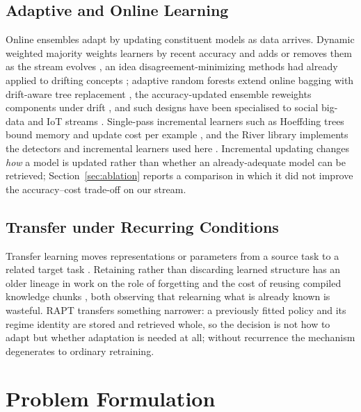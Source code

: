 \documentclass[conference]{IEEEtran}
\begin{document}
\subsection{Adaptive and Online Learning}
Online ensembles adapt by updating constituent models as data arrives. Dynamic
weighted majority weights learners by recent accuracy and adds or removes them as the
stream evolves \cite{JMLR:v8:kolter07a}, an idea disagreement-minimizing methods had
already applied to drifting concepts \cite{helmbold1994tracking}; adaptive random
forests extend online bagging with drift-aware tree replacement \cite{gomes2017adaptive},
the accuracy-updated ensemble reweights components under drift \cite{brzezinski2013reacting},
and such designs have been specialised to social big-data and IoT streams
\cite{abbasi2021elstream,yang2021pwpae}. Single-pass incremental learners such as
Hoeffding trees bound memory and update cost per example \cite{domingos2000mining},
and the River library implements the detectors and incremental learners used here
\cite{montiel2021river}. Incremental updating changes \emph{how} a model is updated
rather than whether an already-adequate model can be retrieved;
Section~\ref{sec:ablation} reports a comparison in which it did not improve the
accuracy--cost trade-off on our stream.

\subsection{Transfer under Recurring Conditions}
Transfer learning moves representations or parameters from a source task to a
related target task \cite{pan2010transfer}. Retaining rather than discarding learned
structure has an older lineage in work on the role of forgetting \cite{markovitch1988role}
and the cost of reusing compiled knowledge chunks \cite{tambe1988some}, both
observing that relearning what is already known is wasteful. RAPT transfers something
narrower: a previously fitted policy and its regime identity are stored and retrieved
whole, so the decision is not how to adapt but whether adaptation is needed at all;
without recurrence the mechanism degenerates to ordinary retraining.

\section{Problem Formulation}
\end{document}
